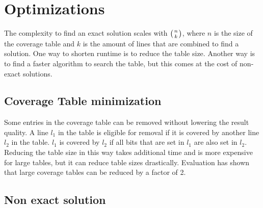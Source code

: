 \section{Optimizations}

The complexity to find an exact solution scales with $\left( n\atop k \right)$, where $n$ is the size of the coverage table and $k$ is the amount of lines that are combined to find a solution. One way to shorten runtime is to reduce the table size. Another way is to find a faster algorithm to search the table, but this comes at the cost of non-exact solutions.

\subsection{Coverage Table minimization}

Some entries in the coverage table can be removed without lowering the result quality. A line $l_1$ in the table is eligible for removal if it is covered by another line $l_2$ in the table. $l_1$ is covered by $l_2$ if all bits that are set in $l_1$ are also set in $l_2$. Reducing the table size in this way takes additional time and is more expensive for large tables, but it can reduce table sizes drastically. Evaluation has shown that large coverage tables can be reduced by a factor of 2.

\subsection{Non exact solution}